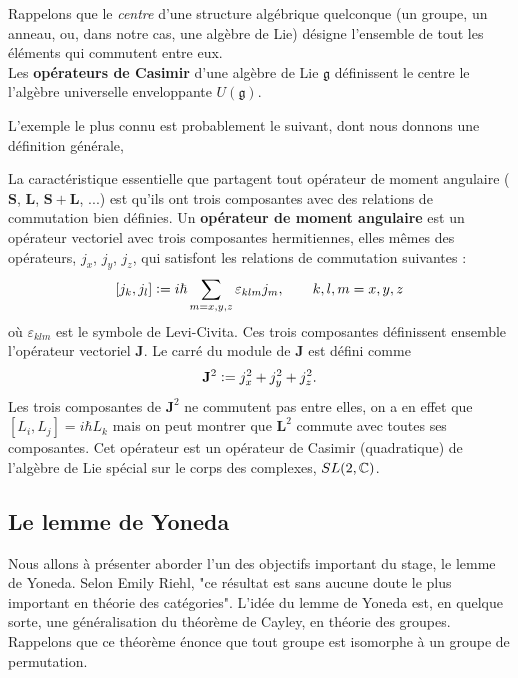 \documentclass{article}
\begin{document}
\begin{definition}{}
    Rappelons que le \textit{centre} d'une structure algébrique quelconque (un groupe, un anneau, ou, dans notre cas, une algèbre de Lie) désigne l'ensemble de tout les éléments qui commutent entre eux.\\

    \noindent
    Les \textbf{opérateurs de Casimir} d'une algèbre de Lie $\mathfrak{g}$ définissent le centre le l'algèbre universelle enveloppante $U(\mathfrak{g})$.
\end{definition}

L'exemple le plus connu est probablement le suivant, dont nous donnons une définition générale,

\begin{example}{}
    La caractéristique essentielle que partagent tout opérateur de moment angulaire ($\mathbf{S}$, $\mathbf{L}$, $\mathbf{S}+\mathbf{L}$, ...) est qu'ils ont trois composantes avec des relations de commutation bien définies. Un \textbf{opérateur de moment angulaire} est un opérateur vectoriel avec trois composantes hermitiennes, elles mêmes des opérateurs, $j_x$, $j_y$, $j_z$, qui satisfont les relations de commutation suivantes :
    $$
    [j_k, j_l]\vcentcolon= i\hbar\sum_{m=x,y,z}\varepsilon_{klm}j_m,\qquad k,l,m=x,y,z
    $$
    où $\varepsilon_{klm}$ est le symbole de Levi-Civita. Ces trois composantes définissent ensemble l'opérateur vectoriel $\mathbf J$. Le carré du module de $\mathbf J$ est défini comme
    $$
    \mathbf J^2\vcentcolon= j_x^2+j_y^2+j_z^2.
    $$
    Les trois composantes de $\mathbf J^2$ ne commutent pas entre elles, on a en effet que $[L_i, L_j]=i\hbar L_k$ mais on peut montrer que $\mathbf L^2$ commute avec toutes ses composantes. Cet opérateur est un opérateur de Casimir (quadratique) de l'algèbre de Lie spécial sur le corps des complexes, $SL(2,\mathbb{C})$.
\end{example}

\subsection{Le lemme de Yoneda}
Nous allons à présenter aborder l'un des objectifs important du stage, le lemme de Yoneda. Selon Emily Riehl, "ce résultat est sans aucune doute le plus important en théorie des catégories". L'idée du lemme de Yoneda est, en quelque sorte, une généralisation du théorème de Cayley, en théorie des groupes. Rappelons que ce théorème énonce que tout groupe est isomorphe à un groupe de permutation.\\
\end{document}
